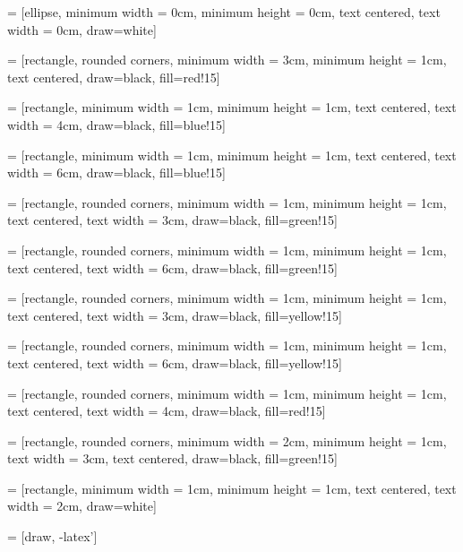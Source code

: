 \RequirePackage{tikz}


 =
[ellipse, minimum width = 0cm, minimum height = 0cm, text centered,
text width = 0cm, draw=white]

 =
[rectangle, rounded corners, minimum width = 3cm, minimum height = 1cm,
text centered, draw=black, fill=red!15]

 =
[rectangle, minimum width = 1cm, minimum height = 1cm, text centered, 
text width = 4cm, draw=black, fill=blue!15]

 =
[rectangle, minimum width = 1cm, minimum height = 1cm, text centered, 
text width = 6cm, draw=black, fill=blue!15]

 =
[rectangle, rounded corners, minimum width = 1cm, minimum height = 1cm,
text centered, text width = 3cm, draw=black, fill=green!15]

 =
[rectangle, rounded corners, minimum width = 1cm, minimum height = 1cm,
text centered, text width = 6cm, draw=black, fill=green!15]

 =
[rectangle, rounded corners, minimum width = 1cm, minimum height = 1cm,
text centered, text width = 3cm, draw=black, fill=yellow!15]

 =
[rectangle, rounded corners, minimum width = 1cm, minimum height = 1cm, 
text centered, text width = 6cm, draw=black, fill=yellow!15]

 =
[rectangle, rounded corners, minimum width = 1cm, minimum height = 1cm, 
text centered, text width = 4cm, draw=black, fill=red!15]

 = 
[rectangle, rounded corners, minimum width = 2cm, minimum height = 1cm, 
text width = 3cm, text centered, draw=black, fill=green!15]

 = 
[rectangle, minimum width = 1cm, minimum height = 1cm, text centered, 
text width = 2cm, draw=white]

 = [draw, -latex']




